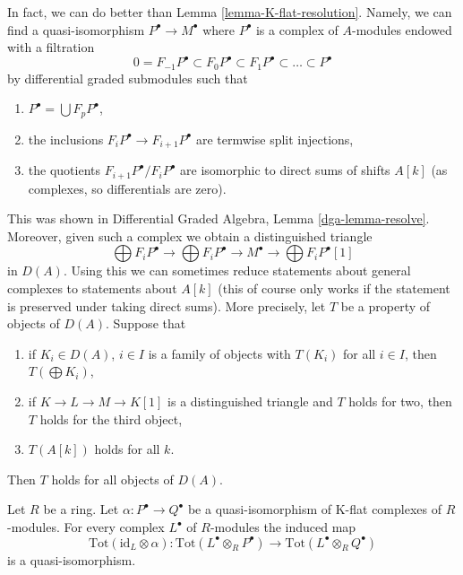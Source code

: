 \begin{remark}
\label{remark-P-resolution}
In fact, we can do better than Lemma \ref{lemma-K-flat-resolution}.
Namely, we can find a quasi-isomorphism
$P^\bullet \to M^\bullet$ where $P^\bullet$ is a complex of $A$-modules
endowed with a filtration
$$
0 = F_{-1}P^\bullet \subset F_0P^\bullet \subset
F_1P^\bullet \subset \ldots \subset P^\bullet
$$
by differential graded submodules such that
\begin{enumerate}
\item $P^\bullet = \bigcup F_pP^\bullet$,
\item the inclusions $F_iP^\bullet \to F_{i + 1}P^\bullet$
are termwise split injections,
\item the quotients $F_{i + 1}P^\bullet/F_iP^\bullet$ are isomorphic to direct
sums of shifts $A[k]$ (as complexes, so differentials are zero).
\end{enumerate}
This was shown in Differential Graded Algebra, Lemma \ref{dga-lemma-resolve}.
Moreover, given such a complex we obtain a distinguished triangle
$$
\bigoplus F_iP^\bullet \to \bigoplus F_iP^\bullet \to M^\bullet
\to \bigoplus F_iP^\bullet[1]
$$
in $D(A)$. Using this we can sometimes reduce statements about general
complexes to statements about $A[k]$ (this of course only works if the
statement is preserved under taking direct sums). More precisely, let
$T$ be a property of objects of $D(A)$. Suppose that
\begin{enumerate}
\item if $K_i \in D(A)$, $i \in I$ is a family of objects with
$T(K_i)$ for all $i \in I$, then $T(\bigoplus K_i)$,
\item if $K \to L \to M \to K[1]$ is a distinguished triangle and
$T$ holds for two, then $T$ holds for the third object,
\item $T(A[k])$ holds for all $k$.
\end{enumerate}
Then $T$ holds for all objects of $D(A)$.
\end{remark}

\begin{lemma}
\label{lemma-derived-tor-quasi-isomorphism-other-side}
Let $R$ be a ring. Let
$\alpha : P^\bullet \to Q^\bullet$ be a quasi-isomorphism of
K-flat complexes of $R$-modules. For every complex $L^\bullet$
of $R$-modules the induced map
$$
\text{Tot}(\text{id}_L \otimes \alpha) :
\text{Tot}(L^\bullet \otimes_R P^\bullet)
\longrightarrow
\text{Tot}(L^\bullet \otimes_R Q^\bullet)
$$
is a quasi-isomorphism.
\end{lemma}

